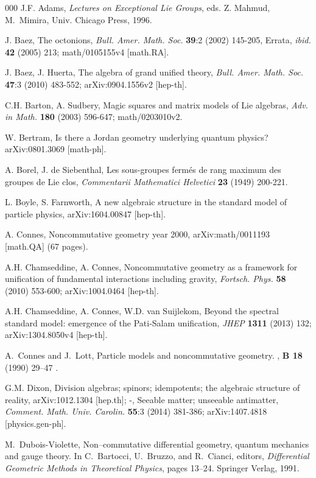 \documentclass{article}
\begin{document}
\begin{thebibliography}{000}
 J.F. Adams, {\it Lectures on Exceptional Lie Groups}, eds. Z. Mahmud, M.~Mimira, Univ. Chicago Press, 1996.

 J. Baez, The octonions, {\it Bull. Amer. Math. Soc.} {\bf 39}:2 (2002) 145-205, Errata, {\it ibid.} {\bf 42} (2005) 213; math/0105155v4 [math.RA].

 J. Baez, J. Huerta, The algebra of grand unified theory, {\it  Bull. Amer. Math. Soc.} {\bf 47}:3 (2010) 483-552; arXiv:0904.1556v2 [hep-th].

 C.H. Barton, A. Sudbery, Magic squares and matrix models of Lie algebras, {\it Adv. in Math.} {\bf 180} (2003) 596-647; math/0203010v2.

 W. Bertram, Is there a Jordan geometry underlying quantum physics? arXiv:0801.3069 [math-ph].

 A. Borel, J. de Siebenthal, Les sous-groupes ferm\'es de rang maximum des groupes de Lie clos,
	\textit{Commentarii Mathematici Helvetici} \textbf{23} (1949) 200-221.

 L. Boyle, S. Farnworth, A new algebraic structure in the standard model of particle physics, arXiv:1604.00847 [hep-th].

 A. Connes, Noncommutative geometry year 2000, arXiv:math/0011193 [math.QA] (67 pages).

 A.H. Chamseddine, A. Connes, Noncommutative geometry as a framework for unification of fundamental interactions including gravity, {\it Fortsch. Phys.} {\bf 58} (2010) 553-600; arXiv:1004.0464 [hep-th].

 A.H. Chamseddine, A. Connes, W.D. van Suijlekom, Beyond the spectral standard model: emergence of the Pati-Salam unification, {\it JHEP} {\bf 1311} (2013) 132; arXiv:1304.8050v4 [hep-th].

 A.~Connes and J.~Lott,
\newblock Particle models and noncommutative geometry.
, {\bf B 18} (1990) 29--47 .

 G.M. Dixon, Division algebras; spinors; idempotents; the algebraic structure of reality, arXiv:1012.1304 [hep.th]; -, Seeable matter; unseeable antimatter, \textit{Comment. Math. Univ. Carolin.} \textbf{55}:3 (2014) 381-386; arXiv:1407.4818 [physics.gen-ph].

 M.~Dubois-Violette, 
\newblock Non--commutative differential geometry, quantum mechanics and gauge
  theory.
\newblock In C.~Bartocci, U.~Bruzzo, and R.~Cianci, editors, {\em Differential
  Geometric Methods in Theoretical Physics}, pages 13--24. Springer Verlag,
  1991.


\end{thebibliography}
\end{document}
